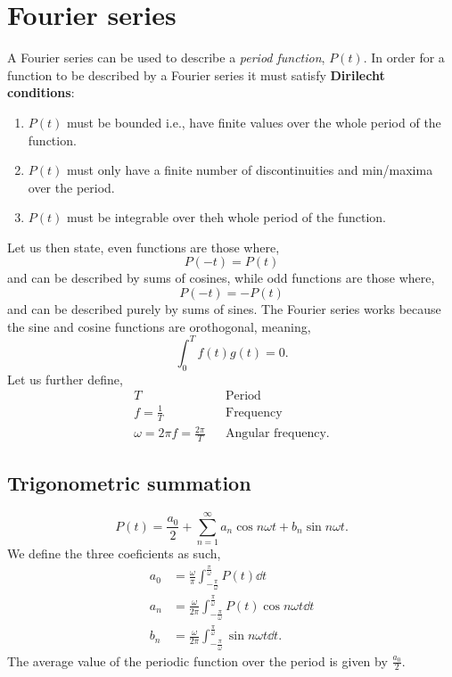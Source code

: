 \documentclass{book}
\begin{document}
\chapter{Fourier series}
A Fourier series can be used to describe a \textit{period function}, $P(t)$. In order for a function to be described by a Fourier series it must satisfy \textbf{Dirilecht conditions}:
\begin{enumerate}
	\item $P(t)$ must be bounded i.e., have finite values over the whole period of the function.
	\item $P(t)$ must only have a finite number of discontinuities and min/maxima over the period.
	\item $P(t)$ must be integrable over theh whole period of the function.
\end{enumerate}
Let us then state, even functions are those where,
\begin{equation}
	P(-t) = P(t)
\end{equation}
and can be described by sums of cosines, while odd functions are those where,
\begin{equation}
	P(-t) = -P(t)
\end{equation}
and can be described purely by sums of sines. The Fourier series works because the sine and cosine functions are orothogonal, meaning,
\begin{equation}
	\int_0^Tf(t)g(t) = 0.
\end{equation}
Let us further define,
\begin{align}
	T && \text{Period} \\
	f = \frac{1}{T} && \text{Frequency} \\
	\omega = 2\pi f = \frac{2\pi}{T} && \text{Angular frequency}.
\end{align}
\section{Trigonometric summation}
\begin{equation}
	P(t) = \frac{a_0}{2} + \sum_{n=1}^{\infty}a_n\cos n\omega t + b_n \sin n \omega t.
\end{equation}
We define the three coeficients as such,
\begin{align}
	a_0 & = \frac{\omega}{\pi}\int_{-\frac{\pi}{\omega}}^{\frac{\pi}{\omega}}P(t)\dd{t} \\
	a_n & = \frac{\omega}{2\pi}\int_{-\frac{\pi}{\omega}}^{\frac{\pi}{\omega}}P(t)\cos n \omega t\dd{t}\\
	b_n & = \frac{\omega}{2\pi}\int_{-\frac{\pi}{\omega}}^{\frac{\pi}{\omega}}\sin n\omega t \dd{t}.
\end{align}
The average value of the periodic function over the period is given by $\frac{a_0}{2}$.
\end{document}
